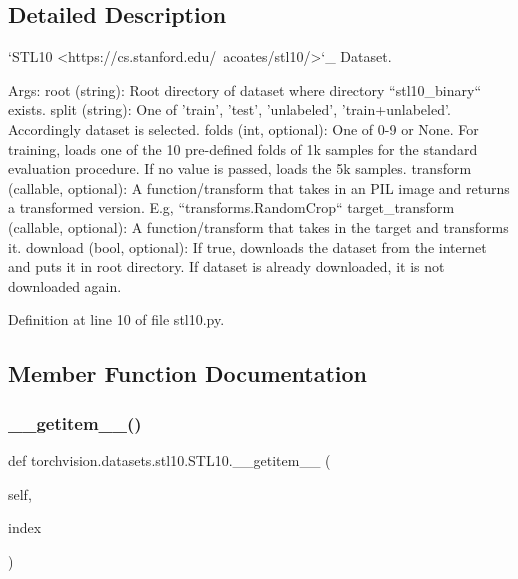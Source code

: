 \subsection{Detailed Description}
\begin{DoxyVerb}`STL10 <https://cs.stanford.edu/~acoates/stl10/>`_ Dataset.

Args:
    root (string): Root directory of dataset where directory
        ``stl10_binary`` exists.
    split (string): One of {'train', 'test', 'unlabeled', 'train+unlabeled'}.
        Accordingly dataset is selected.
    folds (int, optional): One of {0-9} or None.
        For training, loads one of the 10 pre-defined folds of 1k samples for the
         standard evaluation procedure. If no value is passed, loads the 5k samples.
    transform (callable, optional): A function/transform that  takes in an PIL image
        and returns a transformed version. E.g, ``transforms.RandomCrop``
    target_transform (callable, optional): A function/transform that takes in the
        target and transforms it.
    download (bool, optional): If true, downloads the dataset from the internet and
        puts it in root directory. If dataset is already downloaded, it is not
        downloaded again.\end{DoxyVerb}
 

Definition at line 10 of file stl10.\+py.



\subsection{Member Function Documentation}
\mbox{\label{classtorchvision_1_1datasets_1_1stl10_1_1STL10_a70217a5d4cc4dbfb7b4be1f200673b82}} 
\subsubsection{\texorpdfstring{\+\_\+\+\_\+getitem\+\_\+\+\_\+()}{\_\_getitem\_\_()}}
{\footnotesize\ttfamily def torchvision.\+datasets.\+stl10.\+S\+T\+L10.\+\_\+\+\_\+getitem\+\_\+\+\_\+ (\begin{DoxyParamCaption}\item[{}]{self,  }\item[{}]{index }\end{DoxyParamCaption})}

